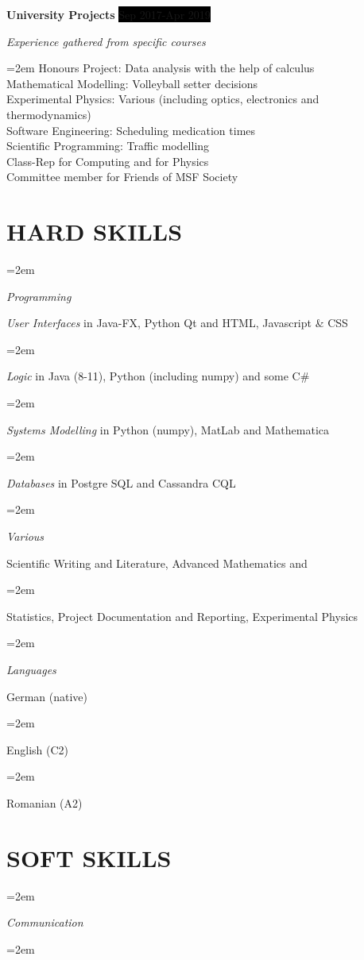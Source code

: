 \documentclass[paper=a4,fontsize=11pt]{scrartcl} %
\newlength{\spacebox}
\newcommand{\sepspace}{\vspace*{1em}}		%
\newcommand{\NewPart}[1]{\section*{\uppercase{#1}}}
\newcommand{\PersonalEntry}[2]{
		\noindent\hangindent=2em\hangafter=0 %
		\parbox{\spacebox}{        %
		\textit{#1}}		       %
		\hspace{1.5em} #2 \par}    %
\newcommand{\SkillsEntry}[2]{      %
		\noindent\hangindent=2em\hangafter=0 %
		\parbox{\spacebox}{        %
		\textit{#1}}			   %
		\hspace{1.5em} \parbox{6\spacebox}{#2} \par}    %
\newcommand{\EducationEntry}[4]{
		\noindent \textbf{#1} \hfill      %
		\colorbox{Black}{%
			\parbox{6em}{%
			\hfill\color{White}#2}} \par  %
		\noindent \textit{#3} \par        %
		\noindent\hangindent=2em\hangafter=0 \small #4 %
		\normalsize \par}
\newcommand{\WorkEntry}[4]{				  %
		\noindent \textbf{#1} \hfill      %
		\colorbox{Black}{\color{White}#2} \par  %
		\noindent \textit{#3} \par              %
		\noindent\hangindent=2em\hangafter=0 \small #4 %
		\normalsize \par}
\begin{document}


\WorkEntry{University Projects}{Sep 2017-Apr 2019}{Experience gathered from specific courses}{
  Honours Project: Data analysis with the help of calculus \\ Mathematical Modelling: Volleyball setter decisions \\Experimental Physics: Various (including optics, electronics and thermodynamics) \\ Software Engineering: Scheduling medication times \\  Scientific Programming: Traffic modelling \\ Class-Rep for Computing and for Physics \\ Committee member for Friends of MSF Society}

\clearpage
\NewPart{Hard Skills}{}

\SkillsEntry{Programming}{\textit{User Interfaces} in Java-FX, Python Qt and HTML, Javascript \& CSS}
\vspace{3pt}
\SkillsEntry{}{\textit{Logic} in Java (8-11), Python (including numpy) and some C\#}
\vspace{3pt}
\SkillsEntry{}{\textit{Systems Modelling} in Python (numpy), MatLab and Mathematica}
\vspace{3pt}
\SkillsEntry{}{\textit{Databases} in Postgre SQL and Cassandra CQL}
\sepspace

\SkillsEntry{Various}{Scientific Writing and Literature, Advanced Mathematics and}
\vspace{3pt}
\SkillsEntry{}{Statistics, Project Documentation and Reporting, Experimental Physics}
\sepspace

\SkillsEntry{Languages}{German (native)}
\SkillsEntry{}{English (C2)}
\SkillsEntry{}{Romanian (A2)}
\sepspace


\NewPart{Soft Skills}{}

\SkillsEntry{Communication}{} %
\vspace{3pt}
\SkillsEntry{}{}
\sepspace
\end{document}
